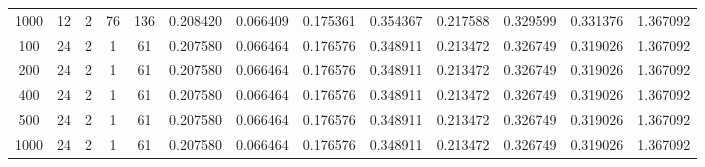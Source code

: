 \begin{table}[h]
\begin{tabular}{ccccccccccccc}
1000 & 12 & 2 & 76 & 136 & 0.208420 & 0.066409 & 0.175361 & 0.354367 & 0.217588 & 0.329599 & 0.331376 & 1.367092 \\
100 & 24 & 2 & 1 & 61 & 0.207580 & 0.066464 & 0.176576 & 0.348911 & 0.213472 & 0.326749 & 0.319026 & 1.367092 \\
200 & 24 & 2 & 1 & 61 & 0.207580 & 0.066464 & 0.176576 & 0.348911 & 0.213472 & 0.326749 & 0.319026 & 1.367092 \\
400 & 24 & 2 & 1 & 61 & 0.207580 & 0.066464 & 0.176576 & 0.348911 & 0.213472 & 0.326749 & 0.319026 & 1.367092 \\
500 & 24 & 2 & 1 & 61 & 0.207580 & 0.066464 & 0.176576 & 0.348911 & 0.213472 & 0.326749 & 0.319026 & 1.367092 \\
1000 & 24 & 2 & 1 & 61 & 0.207580 & 0.066464 & 0.176576 & 0.348911 & 0.213472 & 0.326749 & 0.319026 & 1.367092 \\
\bottomrule
\end{tabular}
\end{table}
